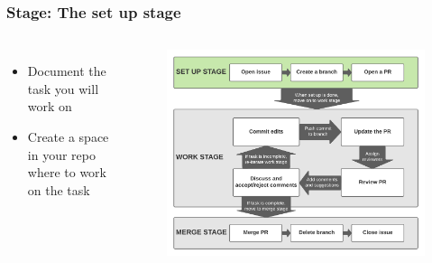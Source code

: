 \documentclass[aspectratio=169]{beamer} %
\begin{document}
\begin{frame}
	\frametitle{Stage: The set up stage}
	\begin{columns}[c]
		
		\begin{itemize}
			\setlength\itemsep{1em}
			\item Document the task you will work on
			\item Create a space in your repo where to work on the task
		\end{itemize}
		
		\vspace{-.75cm}
		\begin{figure}
			\centering
			\includegraphics[width=\textwidth]{./img/branch-pr-merge-cycle-S1.png}
		\end{figure}
		
	\end{columns}
\end{frame}
\end{document}
